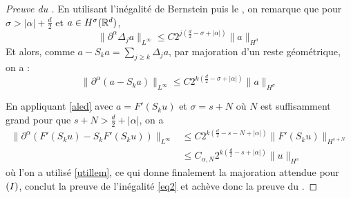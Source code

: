 \documentclass[11pt,a4paper]{article}
\begin{document}
\begin{proof}[Preuve du ]
En utilisant l'inégalité de Bernstein puis le , on remarque que pour $\sigma > |\alpha| + \frac{d}{2}$ et $a\in H^\sigma(\mathbb R^d)$,
\begin{equation*}
\|\partial^\alpha \Delta_j a\|_{L^\infty} \leq C 2^{j(\frac{d}{2}-\sigma+|\alpha|)} \|a\|_{H^\sigma}
\end{equation*}
Et alors, comme $a-S_ka=\sum_{j\geq k} \Delta_j a$, par majoration d'un reste géométrique, on a :
\begin{equation}\label{aled}
\|\partial^\alpha (a-S_k a)\|_{L^\infty} \leq C 2^{k(\frac{d}{2}-\sigma+|\alpha|)} \|a\|_{H^\sigma}
\end{equation}

En appliquant \eqref{aled} avec $a=F'(S_ku)$ et $\sigma = s + N$ où $N$ est suffisamment grand pour que $s+N > \frac{d}{2} + |\alpha|$, on a 
\begin{align*}
\|\partial^\alpha (F'(S_ku)-S_k F'(S_ku))\|_{L^\infty} &\leq C 2^{k(\frac{d}{2}-s-N+|\alpha|)} \|F'(S_ku)\|_{H^{s+N}} \\
& \leq  C_{\alpha,N} 2^{k(\frac{d}{2}-s+|\alpha|)} \|u\|_{H^s}
\end{align*}
où l'on a utilisé \eqref{utillem}, ce qui donne finalement la majoration attendue pour $(\rom{1})$, conclut la preuve de l'inégalité \eqref{eq2} et achève donc la preuve du .
\end{proof}



















\newpage
\printbibliography[heading=bibintoc, title={Références}]
\end{document}
